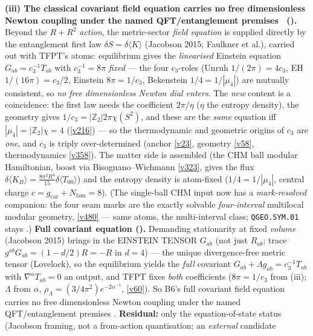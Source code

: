 \documentclass[11pt,a4paper]{article}
\newcommand{\cthree}{c_3}
\newcommand{\Nfam}{N_{\mathrm{fam}}}
\newcommand{\Z}{\mathbb{Z}}
\begin{document}
\begin{keybox}
\textbf{(iii) The classical covariant field equation carries no free dimensionless Newton coupling under the named QFT/entanglement premises \mC\ ().} Beyond
the $R{+}R^2$ \emph{action}, the metric-sector \emph{field equation} is supplied directly by the entanglement first
law $\delta S=\delta\langle K\rangle$ (Jacobson 2015; Faulkner et al.), carried out with TFPT's atoms: equilibrium
gives the \emph{linearised} Einstein equation $G_{ab}=\cthree^{-1}T_{ab}$ with $\cthree^{-1}=8\pi$ \emph{fixed} ---
the four $\cthree$-roles (Unruh $1/(2\pi){=}4\cthree$, EH $1/(16\pi){=}\cthree/2$, Einstein $8\pi{=}1/\cthree$,
Bekenstein $1/4{=}1/|\mu_4|$) are mutually consistent, so \emph{no free dimensionless Newton dial enters}. The
\emph{new} content is a coincidence: the first law needs the coefficient $2\pi/\eta$ ($\eta$ the entropy density),
the geometry gives $1/\cthree=|\Z_2|2\pi\chi(S^2)$, and these are the \emph{same} equation iff $|\mu_4|=|\Z_2|\chi=4$
(\vref{v216}) --- so the thermodynamic and geometric origins of $\cthree$ are \emph{one}, and $\cthree$ is triply
over-determined (anchor \vref{v23}, geometry \vref{v58}, thermodynamics \vref{v358}). The matter side is assembled
(the CHM ball modular Hamiltonian, boost via Bisognano--Wichmann \vref{v323}, gives the flux
$\delta\langle K_B\rangle=\tfrac{8\pi^2R^4}{15}\delta\langle T_{00}\rangle$) and the entropy density is atom-fixed
($1/4{=}1/|\mu_4|$, central charge $c=g_{\mathrm{car}}{+}\Nfam=8$). (The single-ball CHM input now has a
\emph{mark-resolved} companion: the four seam marks are the exactly solvable \emph{four-interval} multilocal
modular geometry, \vref{v480} --- same atoms, the multi-interval class; \texttt{QGEO.SYM.01} stays \mO.) \textbf{Full covariant equation
().} Demanding stationarity at fixed \emph{volume} (Jacobson 2015) brings in
the EINSTEIN TENSOR $G_{ab}$ (not just $R_{ab}$; trace $g^{ab}G_{ab}=(1-d/2)R=-R$ in $d{=}4$) --- the unique
divergence-free metric tensor (Lovelock), so the equilibrium yields the \emph{full} covariant
$G_{ab}+\Lambda g_{ab}=\cthree^{-1}T_{ab}$ with $\nabla^aT_{ab}{=}0$ an output, and TFPT fixes \emph{both}
coefficients ($8\pi{=}1/\cthree$ from (iii); $\Lambda$ from $\alpha$, $\rho_\Lambda=(3/4\pi^2)e^{-2\alpha^{-1}}$,
\vref{v60}). So B6's full covariant field equation carries no free dimensionless Newton coupling under the named QFT/entanglement premises \mC. \textbf{Residual:}
only the equation-of-state status (Jacobson framing, not a from-action quantisation; an \emph{external} candidate

\end{keybox}
\end{document}
